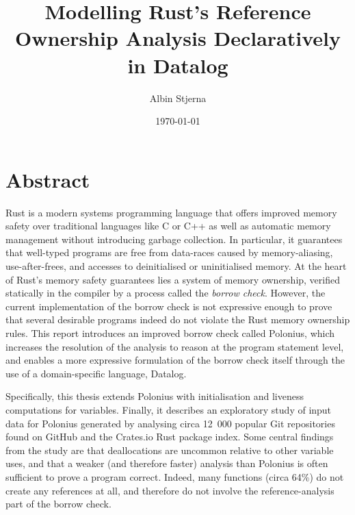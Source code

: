 \documentclass[11pt,a4paper,twoside,openany]{report}
\author{Albin Stjerna}
\date{\today}
\title{Modelling Rust's Reference Ownership Analysis Declaratively in Datalog}
\begin{document}



\maketitle

\section*{Abstract}

Rust is a modern systems programming language that offers improved memory safety
over traditional languages like C or C++ as well as automatic memory management
without introducing garbage collection. In particular, it guarantees that
well-typed programs are free from data-races caused by memory-aliasing,
use-after-frees, and accesses to deinitialised or uninitialised memory. At the
heart of Rust's memory safety guarantees lies a system of memory ownership,
verified statically in the compiler by a process called the \textit{borrow
  check}. However, the current implementation of the borrow check is not
expressive enough to prove that several desirable programs indeed do not violate
the Rust memory ownership rules. This report introduces an improved borrow check
called Polonius, which increases the resolution of the analysis to reason at the
program statement level, and enables a more expressive formulation of the borrow
check itself through the use of a domain-specific language, Datalog.

Specifically, this thesis extends Polonius with initialisation and liveness
computations for variables. Finally, it describes an exploratory study of input
data for Polonius generated by analysing circa 12~000 popular Git repositories
found on GitHub and the Crates.io Rust package index. Some central findings from
the study are that deallocations are uncommon relative to other variable uses,
and that a weaker (and therefore faster) analysis than Polonius is often
sufficient to prove a program correct. Indeed, many functions (circa 64\%) do
not create any references at all, and therefore do not involve the
reference-analysis part of the borrow check.
\end{document}
